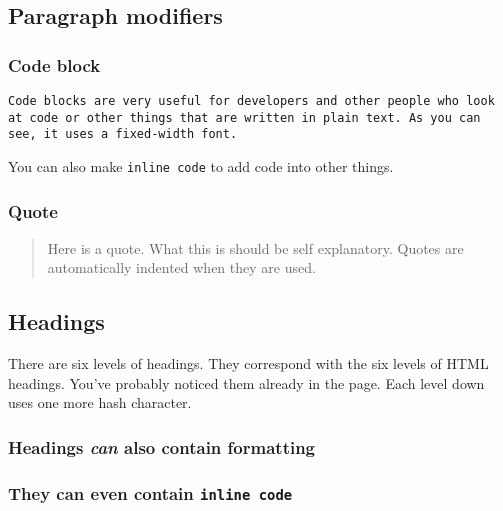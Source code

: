 \hypertarget{paragraph-modifiers}{%
\subsection{Paragraph modifiers}\label{paragraph-modifiers}}

\hypertarget{code-block}{%
\subsubsection{Code block}\label{code-block}}

\begin{verbatim}
Code blocks are very useful for developers and other people who look at code or other things that are written in plain text. As you can see, it uses a fixed-width font.
\end{verbatim}

You can also make \texttt{inline\ code} to add code into other things.

\hypertarget{quote}{%
\subsubsection{Quote}\label{quote}}

\begin{quote}
Here is a quote. What this is should be self explanatory. Quotes are
automatically indented when they are used.
\end{quote}

\hypertarget{headings}{%
\subsection{Headings}\label{headings}}

There are six levels of headings. They correspond with the six levels of
HTML headings. You've probably noticed them already in the page. Each
level down uses one more hash character.

\hypertarget{headings-can-also-contain-formatting}{%
\subsubsection{\texorpdfstring{Headings \emph{can} also contain
\textbf{formatting}}{Headings can also contain formatting}}\label{headings-can-also-contain-formatting}}

\hypertarget{they-can-even-contain-inline-code}{%
\subsubsection{\texorpdfstring{They can even contain
\texttt{inline\ code}}{They can even contain inline code}}\label{they-can-even-contain-inline-code}}

